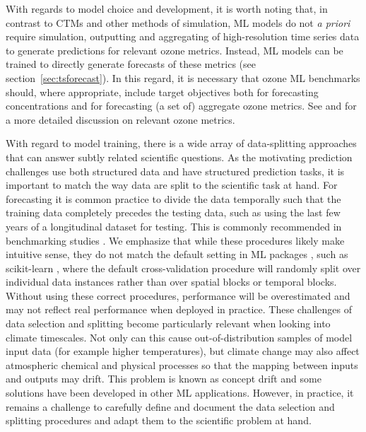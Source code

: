 \documentclass[gmd, manuscript]{copernicus}
\begin{document}
With regards to model choice and development, it is worth noting that, in contrast to CTMs and other methods of simulation, ML models do not \emph{a priori} require simulation, outputting and aggregating of high-resolution time series data to generate predictions for relevant ozone metrics. Instead, ML models can be trained to directly generate forecasts of these metrics (see section~\ref{sec:tsforecast}). In this regard, it is necessary that ozone ML benchmarks should, where appropriate, include target objectives both for forecasting concentrations and for forecasting (a set of) aggregate ozone metrics. See \citet{Fleming2018} and \citet{Lefohn2018} for a more detailed discussion on relevant ozone metrics. 

With regard to model training, there is a wide array of data-splitting approaches that can answer subtly related scientific questions. As the motivating prediction challenges use both structured data and have structured prediction tasks, it is important to match the way data are split to the scientific task at hand.
For forecasting it is common practice to divide the data temporally such that the training data completely precedes the testing data, such as using the last few years of a longitudinal dataset for testing. This is commonly recommended in benchmarking studies \citep{lam_learning_2023, Rasp2020}. 
We emphasize that while these procedures likely make intuitive sense, they do not match the default setting in ML packages \citep{schultz_can_2021}, such as scikit-learn \citep{pedregosa_scikit-learn_2011}, where the default cross-validation procedure will randomly split over individual data instances rather than over spatial blocks or temporal blocks. Without using these correct procedures, performance will be overestimated and may not reflect real performance when deployed in practice. 
These challenges of data selection and splitting become particularly relevant when looking into climate timescales. Not only can this cause out-of-distribution samples of model input data (for example higher temperatures), but climate change may also affect atmospheric chemical and physical processes so that the mapping between inputs and outputs may drift. This problem is known as concept drift and some solutions have been developed in other ML applications. However, in practice, it remains a challenge to carefully define and document the data selection and splitting procedures and adapt them to the scientific problem at hand.
\end{document}
